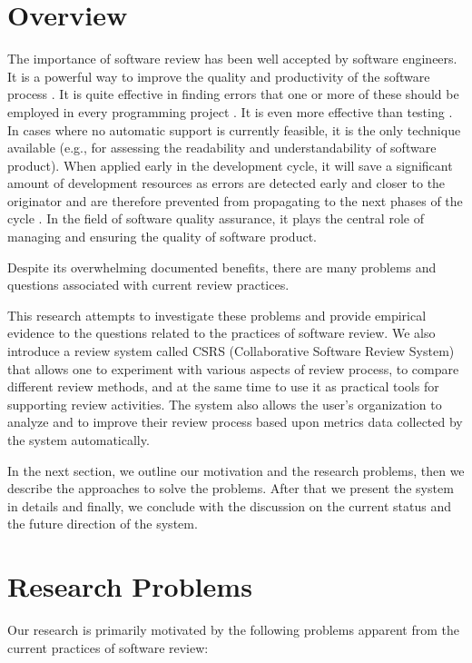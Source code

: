 
\tableofcontents
\newpage


\section {Overview}

The importance of software review has been well accepted by
software engineers. It is a powerful way to improve the quality
and productivity of the software process \cite{Humphrey90}. It is quite
effective in finding errors that one or more of these should be
employed in every programming project \cite{Myers79}. It is even more
effective than testing \cite{Basili85}. In cases where no automatic support is
currently feasible, it is the only technique available (e.g.,
for assessing the readability and understandability of software
product). 
When  applied early in the development cycle, it will save a
significant amount of development resources as errors are detected
early and closer to the originator and are therefore prevented
from propagating to the next phases of the cycle \cite{Fagan76}.
In the field of software quality assurance, it plays
the central role of managing and ensuring the quality of software
product. 

Despite its overwhelming documented benefits, there are many
problems and questions associated with current review practices. 

This research attempts to investigate these problems and
provide empirical evidence to the questions related to the practices of
software review.
We also introduce a review system called CSRS (Collaborative Software
Review System) that allows one to
experiment with  various aspects of review process, to compare
different review methods,  and at the same 
time to use it as practical tools for supporting review activities.
The system also allows the user's organization to analyze and 
to improve their review process based upon metrics data collected by
the system automatically. 

In the next section, we outline our motivation and the research
problems, then we describe the approaches to solve the problems.
After that we present the system in details and
finally, we conclude with the discussion on the current status
and the future direction  of the system.

\section {Research Problems}
Our research is primarily motivated by the following problems apparent
from the current practices of software review:

